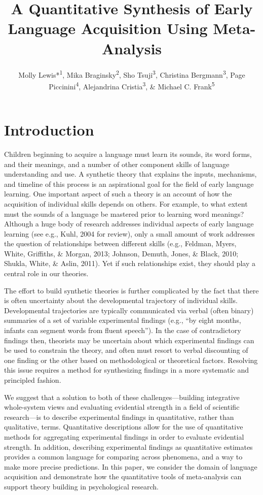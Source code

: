 \documentclass[english,floatsintext,man]{apa6}
\title{A Quantitative Synthesis of Early Language Acquisition Using
Meta-Analysis}
\author{Molly Lewis*\textsuperscript{1}, Mika Braginsky\textsuperscript{2}, Sho Tsuji\textsuperscript{3}, Christina Bergmann\textsuperscript{3}, Page Piccinini\textsuperscript{4}, Alejandrina Cristia\textsuperscript{3}, \& Michael C. Frank\textsuperscript{5}}
\affiliation{
    \vspace{0.5cm}
          \textsuperscript{1} Computation Institute, University of Chicago\\
          \textsuperscript{2} Department of Brain and Cognitive Sciences, MIT\\
          \textsuperscript{3} Laboratoire de Sciences Cognitives et Psycholinguistique, ENS\\
          \textsuperscript{4} NeuroPsychologie Interventionnelle, ENS\\
          \textsuperscript{5} Department of Psychology, Stanford University  }
\theoremstyle{definition}
\theoremstyle{definition}
\theoremstyle{remark}
\begin{document}
\maketitle

\setcounter{secnumdepth}{0}



\section{Introduction}\label{introduction}

Children beginning to acquire a language must learn its sounds, its word
forms, and their meanings, and a number of other component skills of
language understanding and use. A synthetic theory that explains the
inputs, mechanisms, and timeline of this process is an aspirational goal
for the field of early language learning. One important aspect of such a
theory is an account of how the acquisition of individual skills depends
on others. For example, to what extent must the sounds of a language be
mastered prior to learning word meanings? Although a huge body of
research addresses individual aspects of early language learning (see
e.g., Kuhl, 2004 for review), only a small amount of work addresses the
question of relationships between different skills (e.g., Feldman,
Myers, White, Griffiths, \& Morgan, 2013; Johnson, Demuth, Jones, \&
Black, 2010; Shukla, White, \& Aslin, 2011). Yet if such relationships
exist, they should play a central role in our theories.

The effort to build synthetic theories is further complicated by the
fact that there is often uncertainty about the developmental trajectory
of individual skills. Developmental trajectories are typically
communicated via verbal (often binary) summaries of a set of variable
experimental findings (e.g., \enquote{by eight months, infants can
segment words from fluent speech}). In the case of contradictory
findings then, theorists may be uncertain about which experimental
findings can be used to constrain the theory, and often must resort to
verbal discounting of one finding or the other based on methodological
or theoretical factors. Resolving this issue requires a method for
synthesizing findings in a more systematic and principled fashion.

We suggest that a solution to both of these challenges---building
integrative whole-system views and evaluating evidential strength in a
field of scientific research---is to describe experimental findings in
quantitative, rather than qualitative, terms. Quantitative descriptions
allow for the use of quantitative methods for aggregating experimental
findings in order to evaluate evidential strength. In addition,
describing experimental findings as quantitative estimates provides a
common language for comparing across phenomena, and a way to make more
precise predictions. In this paper, we consider the domain of language
acquisition and demonstrate how the quantitative tools of meta-analysis
can support theory building in psychological research.
\end{document}
